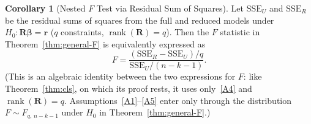 \documentclass[12pt,a4paper]{article}
\theoremstyle{definition}
\newtheorem{corollary}[theorem]{Corollary}
\DeclareMathOperator\rank{rank}
\newcommand{\SSE}{\mathrm{SSE}}
\def\bb{\boldsymbol{\beta}}
\newcommand{\bR}{\mathbf{R}}
\newcommand{\br}{\mathbf{r}}
\begin{document}
\begin{corollary}[Nested $F$ Test via Residual Sum of Squares]\label{cor:nested-F}
Let $\SSE_U$ and $\SSE_R$ be the residual sums of squares from the full and reduced models under $H_0\colon \bR\bb = \br$ ($q$ constraints, $\rank(\bR) = q$). Then the $F$ statistic in Theorem~\ref{thm:general-F} is equivalently expressed as
\begin{equation}
F = \frac{(\SSE_R - \SSE_U)/q}{\SSE_U/(n-k-1)}.
\end{equation}
(This is an algebraic identity between the two expressions for $F$: like Theorem~\ref{thm:cls}, on which its proof rests, it uses only~\ref{A4} and $\rank(\bR) = q$. Assumptions~\ref{A1}--\ref{A5} enter only through the distribution $F \sim F_{q,\, n-k-1}$ under $H_0$ in Theorem~\ref{thm:general-F}.)
\end{corollary}
\end{document}
